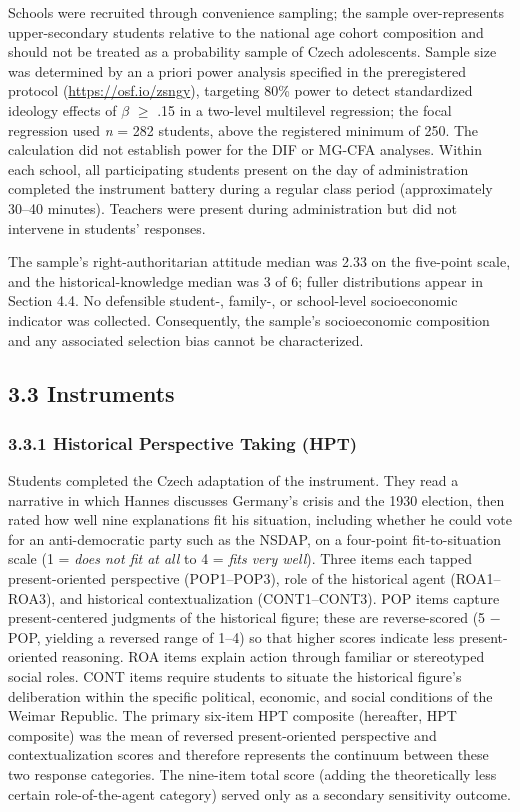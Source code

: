 \documentclass[PCJ,Unicode,screen,mode=plain]{cedram}
\begin{document}
Schools were recruited through convenience sampling; the sample over-represents upper-secondary students relative to the national age cohort composition and should not be treated as a probability sample of Czech adolescents. Sample size was determined by an a priori power analysis specified in the
preregistered protocol (\url{https://osf.io/zsngy}), targeting 80\% power to detect standardized ideology effects of \(\beta\) \(\geq\) .15 in a two-level multilevel regression; the focal regression used \emph{n} = 282 students, above the registered minimum of 250. The calculation did not establish power for the DIF or MG-CFA analyses. Within each school, all participating students present on the day of administration completed the instrument battery during a regular class period (approximately 30--40 minutes). Teachers were present during administration but did not intervene in students' responses.

The sample's right-authoritarian attitude median was 2.33 on the
five-point scale, and the historical-knowledge median was 3 of 6; fuller
distributions appear in Section 4.4. No defensible student-, family-, or
school-level socioeconomic indicator was collected. Consequently, the sample's
socioeconomic composition and any associated selection bias cannot be
characterized.

\subsection*{3.3 Instruments}\label{instruments}

\subsubsection*{3.3.1 Historical Perspective Taking (HPT)}\label{historical-perspective-taking-hpt}

Students completed the Czech adaptation of the \citet{Hartmann_Hasselhorn2008Historical} instrument. They read a narrative in which Hannes discusses Germany's crisis and the 1930 election, then rated how well nine explanations fit his situation, including whether he
could vote for an anti-democratic party such as the NSDAP, on a four-point
fit-to-situation scale (1 = \emph{does not fit at all} to 4 = \emph{fits very
well}). Three items each tapped present-oriented perspective (POP1--POP3), role of the historical agent (ROA1--ROA3), and historical contextualization (CONT1--CONT3). POP items capture present-centered judgments of the historical figure; these are reverse-scored (5 $-$ POP, yielding a reversed range of 1--4) so that higher scores indicate less present-oriented reasoning. ROA items explain action through familiar or stereotyped social roles. CONT items require students to situate the historical figure's deliberation within the specific political, economic, and social conditions of the Weimar Republic. The primary six-item HPT composite (hereafter, HPT composite) was the mean of reversed present-oriented perspective and contextualization scores and therefore represents the continuum between these two response categories. The nine-item total score (adding the theoretically less certain role-of-the-agent category) served only as a secondary sensitivity outcome.
\end{document}
